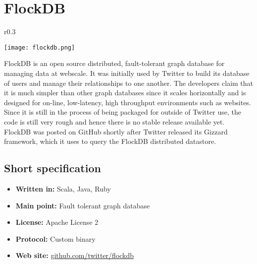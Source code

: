 \chapter{FlockDB}

\begin{wrapfigure}{r}{0.3\textwidth}
  \vspace{-42pt}
  \begin{center}
    \texttt{[image: flockdb.png]}
  \end{center}
  \vspace{-20pt}
\end{wrapfigure}
FlockDB is an open source distributed, fault-tolerant graph database for managing data at webscale. It was initially used by Twitter to build its database of users and manage their relationships to one another. The developers claim that it is much simpler than other graph databases since it scales horizontally and is designed for on-line, low-latency, high throughput environments such as websites. Since it is still in the process of being packaged for outside of Twitter use, the code is still very rough and hence there is no stable release available yet. FlockDB was posted on GitHub shortly after Twitter released its Gizzard framework, which it uses to query the FlockDB distributed datastore. 

\section{Short specification}

\begin{itemize}
  \item \textbf{Written in:} Scala, Java, Ruby
  \item \textbf{Main point:} Fault tolerant graph database
  \item \textbf{License:} Apache License 2
  \item \textbf{Protocol:} Custom binary
  \item \textbf{Web site:} \href{https://github.com/twitter/flockdb}{github.com/twitter/flockdb}
\end{itemize}
